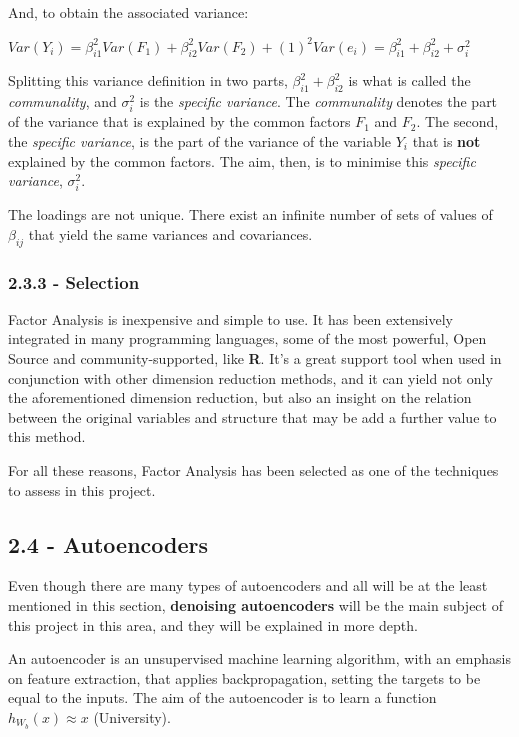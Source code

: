 \documentclass[]{article}
\begin{document}
And, to obtain the associated variance:

\(Var(Y_i) = \beta_{i1}^2Var(F_1) + \beta_{i2}^2Var(F_2) + (1)^2Var(e_i) = \beta_{i1}^2 + \beta_{i2}^2 + \sigma_i^2\)

Splitting this variance definition in two parts,
\(\beta_{i1}^2 + \beta_{i2}^2\) is what is called the
\emph{communality}, and \(\sigma_i^2\) is the \emph{specific variance}.
The \emph{communality} denotes the part of the variance that is
explained by the common factors \(F_1\) and \(F_2\). The second, the
\emph{specific variance}, is the part of the variance of the variable
\(Y_i\) that is \textbf{not} explained by the common factors. The aim,
then, is to minimise this \emph{specific variance}, \(\sigma_i^2\).

The loadings are not unique. There exist an infinite number of sets of
values of \(\beta_{ij}\) that yield the same variances and covariances.

\subsubsection{2.3.3 - Selection}\label{selection-1}

Factor Analysis is inexpensive and simple to use. It has been
extensively integrated in many programming languages, some of the most
powerful, Open Source and community-supported, like \textbf{R}. It's a
great support tool when used in conjunction with other dimension
reduction methods, and it can yield not only the aforementioned
dimension reduction, but also an insight on the relation between the
original variables and structure that may be add a further value to this
method.

For all these reasons, Factor Analysis has been selected as one of the
techniques to assess in this project.

\subsection{2.4 - Autoencoders}\label{autoencoders}

Even though there are many types of autoencoders and all will be at the
least mentioned in this section, \textbf{denoising autoencoders} will be
the main subject of this project in this area, and they will be
explained in more depth.

An autoencoder is an unsupervised machine learning algorithm, with an
emphasis on feature extraction, that applies backpropagation, setting
the targets to be equal to the inputs. The aim of the autoencoder is to
learn a function \(h_{W_b}(x) \approx x\) (University).
\end{document}
